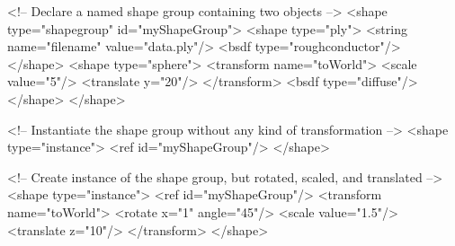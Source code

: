 \vspace{5mm}
\begin{xml}[caption={An example of geometry instancing}, label=lst:instancing]
<!-- Declare a named shape group containing two objects -->
<shape type="shapegroup" id="myShapeGroup">
    <shape type="ply">
        <string name="filename" value="data.ply"/>
        <bsdf type="roughconductor"/>
    </shape>
    <shape type="sphere">
        <transform name="toWorld">
            <scale value="5"/>
            <translate y="20"/>
        </transform>
        <bsdf type="diffuse"/>
    </shape>
</shape>

<!-- Instantiate the shape group without any kind of transformation -->
<shape type="instance">
    <ref id="myShapeGroup"/>
</shape>

<!-- Create instance of the shape group, but rotated, scaled, and translated -->
<shape type="instance">
    <ref id="myShapeGroup"/>
    <transform name="toWorld">
        <rotate x="1" angle="45"/>
        <scale value="1.5"/>
        <translate z="10"/>
    </transform>
</shape>
\end{xml}

